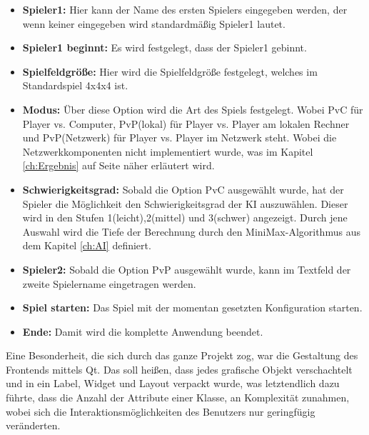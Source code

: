 \documentclass[a4paper]{scrartcl}
\begin{document}
\begin{itemize}
	\item \textbf{Spieler1: } Hier kann der Name des ersten Spielers eingegeben werden, der wenn keiner eingegeben wird standardmäßig Spieler1 lautet.
	\item \textbf{Spieler1 beginnt: } Es wird festgelegt, dass der Spieler1 gebinnt.
	\item \textbf{Spielfeldgröße: } Hier wird die Spielfeldgröße festgelegt, welches im Standardspiel 4x4x4 ist.
	\item \textbf{Modus: } Über diese Option wird die Art des Spiels festgelegt. Wobei PvC für Player vs. Computer, PvP(lokal) für Player vs. Player am lokalen Rechner und PvP(Netzwerk) für Player vs. Player im Netzwerk steht. Wobei die Netzwerkkomponenten nicht implementiert wurde, was im Kapitel \ref{ch:Ergebnis} auf Seite \pageref{ch:Ergebnis} näher erläutert wird.
	\item \textbf{\glqq Schwierigkeitsgrad\grqq: } Sobald die Option PvC ausgewählt wurde, hat der Spieler die Möglichkeit den Schwierigkeitsgrad der KI auszuwählen. Dieser wird in den Stufen 1(leicht),2(mittel) und 3(schwer) angezeigt.  Durch jene Auswahl wird die Tiefe der Berechnung durch den MiniMax-Algorithmus aus dem Kapitel \ref{ch:AI} definiert. 
	\item \textbf{Spieler2: } Sobald die Option PvP ausgewählt wurde, kann im Textfeld der zweite Spielername eingetragen werden.
	\item \textbf{Spiel starten: } Das Spiel mit der momentan gesetzten Konfiguration starten.
	\item \textbf{Ende: } Damit wird die komplette Anwendung beendet.
\end{itemize}

Eine Besonderheit, die sich durch das ganze Projekt zog, war die Gestaltung des Frontends mittels Qt. Das soll heißen, dass jedes grafische Objekt verschachtelt und in ein Label, Widget und Layout verpackt wurde, was letztendlich dazu führte, dass die Anzahl der Attribute einer Klasse, an Komplexität zunahmen, wobei sich die Interaktionsmöglichkeiten  des Benutzers nur geringfügig veränderten.
 
\end{document}
